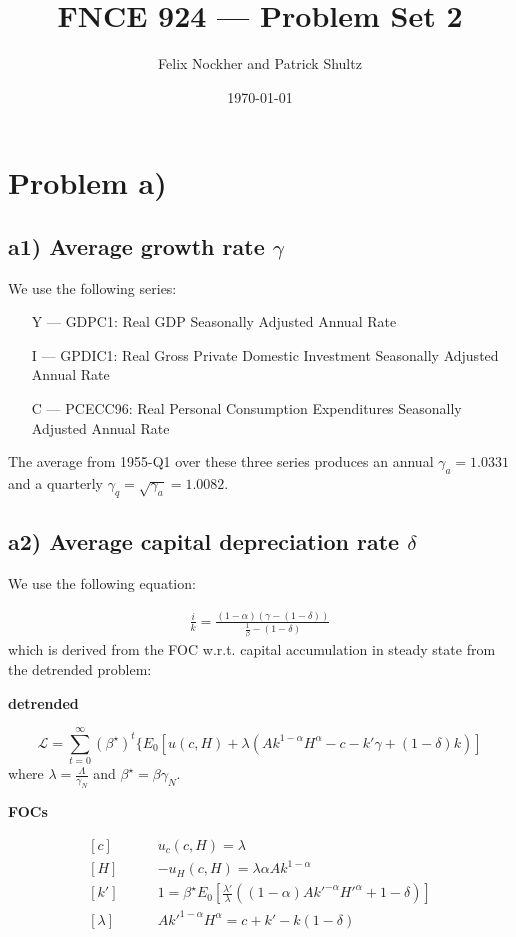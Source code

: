 \documentclass[10pt,letter]{article}
\begin{document}
\title{FNCE 924 --- Problem Set 2}
\author{Felix Nockher and Patrick Shultz}
\date{\today}
\maketitle 

\section*{Problem a)}

\subsection*{a1) Average growth rate $\gamma$}
We use the following series:

\begin{itemize}
	\item[Y ---] GDPC1: Real GDP Seasonally Adjusted Annual Rate
	\item[I ---] GPDIC1: Real Gross Private Domestic Investment Seasonally Adjusted Annual Rate
	\item[C ---] PCECC96: Real Personal Consumption Expenditures Seasonally Adjusted Annual Rate
\end{itemize}
The average from 1955-Q1 over these three series produces an annual $\gamma_a = 1.0331$ and a quarterly $\gamma_q = \sqrt{\gamma_a} = 1.0082$.

\subsection*{a2) Average capital depreciation rate $\delta$}

We use the following equation:

\begin{align*}
\frac{i}{k} = \frac{(1-\alpha) (\gamma - (1-\delta))}{\frac{1}{\beta}- (1-\delta)}
\end{align*}
which is derived from the FOC w.r.t. capital accumulation in steady state from the detrended problem:

\textbf{detrended}

$$\mathcal{L}= \sum_{t=0}^{\infty} (\beta^\star)^t \lbrace E_0 \left[ u(c,H) + \lambda (Ak^{1-\alpha}H^\alpha-c -k'\gamma + (1-\delta)k )  \right]  $$
where $\lambda = \frac{\Lambda}{\gamma_N}$ and $\beta^\star = \beta \gamma_N$.

\textbf{FOCs}

\begin{align*} \label{FOCs}
[c]\qquad& u_c(c,H) = \lambda \\
[H]\qquad& -u_H(c,H) = \lambda \alpha A k^{1-\alpha} \\
[k']\qquad& 1 = \beta^\star E_0\left[ \frac{\lambda'}{\lambda} \left( (1-\alpha) Ak'^{-\alpha} H'^{\alpha} + 1-\delta \right) \right]\\
[\lambda]\qquad& Ak'^{1-\alpha} H^\alpha  = c+k'-k(1-\delta)
\end{align*}
\end{document}
